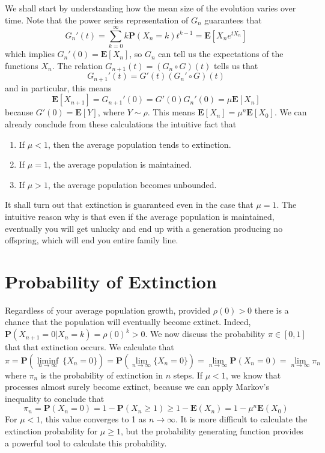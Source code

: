 We shall start by understanding how the mean size of the evolution varies over time. Note that the power series representation of $G_n$ guarantees that
%
\[ G_n'(t) = \sum_{k = 0}^\infty k \mathbf{P}(X_n = k) t^{k-1} = \mathbf{E}[X_ne^{tX_n}] \]
%
which implies $G_n'(0) = \mathbf{E}[X_n]$, so $G_n$ can tell us the expectations of the functions $X_n$. The relation $G_{n+1}(t) = (G_n \circ G)(t)$ tells us that
%
\[ G_{n+1}'(t) = G'(t)(G_n' \circ G)(t) \]
%
and in particular, this means
%
\[ \mathbf{E}[X_{n+1}] = G_{n+1}'(0) = G'(0) G_n'(0) = \mu \mathbf{E}[X_n] \]
%
because $G'(0) = \mathbf{E}[Y]$, where $Y \sim \rho$. This means $\mathbf{E}[X_n] = \mu^n \mathbf{E}[X_0]$. We can already conclude from these calculations the intuitive fact that
%
\begin{enumerate}
    \item If $\mu < 1$, then the average population tends to extinction.
    \item If $\mu = 1$, the average population is maintained.
    \item If $\mu > 1$, the average population becomes unbounded.
\end{enumerate}
%
It shall turn out that extinction is guaranteed even in the case that $\mu = 1$. The intuitive reason why is that even if the average population is maintained, eventually you will get unlucky and end up with a generation producing no offspring, which will end you entire family line.

\section{Probability of Extinction}

Regardless of your average population growth, provided $\rho(0) > 0$ there is a chance that the population will eventually become extinct. Indeed, $\mathbf{P}(X_{n+1} = 0|X_n = k) = \rho(0)^k > 0$. We now discuss the probability $\pi \in [0,1]$ that that extinction occurs. We calculate that
%
\[ \pi = \mathbf{P} \left( \liminf_{n \to \infty}\ \{ X_n = 0 \} \right) = \mathbf{P} \left( \lim_{n \to \infty} \{ X_n = 0 \} \right) = \lim_{n \to \infty} \mathbf{P}(X_n = 0) = \lim_{n \to \infty} \pi_n \]
%
where $\pi_n$ is the probability of extinction in $n$ steps. If $\mu < 1$, we know that processes almost surely become extinct, because we can apply Markov's inequality to conclude that
%
\[ \pi_n = \mathbf{P}(X_n = 0) = 1 - \mathbf{P}(X_n \geq 1) \geq 1 - \mathbf{E}(X_n) = 1 - \mu^n \mathbf{E}(X_0) \]
%
For $\mu < 1$, this value converges to 1 as $n \to \infty$. It is more difficult to calculate the extinction probability for $\mu \geq 1$, but the probability generating function provides a powerful tool to calculate this probability.

